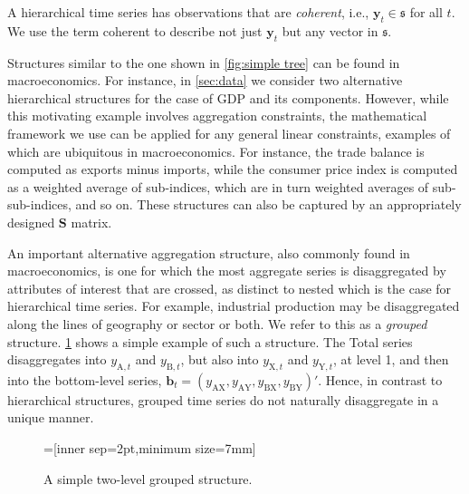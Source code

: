 {\begin{property}
	A hierarchical time series has observations that are \textit{coherent}, i.e., $\bm{y}_{t} \in \mathfrak{s}$ for all $t$. We use the term coherent to describe not just $\bm{y}_t$ but any vector in $\mathfrak{s}$.
	\label{prop:coherence}
\end{property}

Structures similar to the one shown in \ref{fig:simple tree} can be found in macroeconomics. For instance, in \ref{sec:data} we consider two alternative hierarchical structures for the case of GDP and its components. However, while this motivating example involves aggregation constraints, the mathematical framework we use can be applied for any general linear constraints, examples of which are ubiquitous in macroeconomics. For instance, the trade balance is computed as exports minus imports, while the consumer price index is computed as a weighted average of sub-indices, which are in turn weighted averages of sub-sub-indices, and so on. These structures can also be captured by an appropriately designed $\bm{S}$ matrix.

An important alternative aggregation structure, also commonly found in macroeconomics, is one for which the most aggregate series is disaggregated by attributes of interest that are crossed, as distinct to nested which is the case for hierarchical time series. For example, industrial production may be disaggregated along the lines of geography or sector or both. We refer to this as a \textit{grouped} structure. \ref{fig:simple grouped tree} shows a simple example of such a structure. The Total series disaggregates into $y_{\text{A},t}$ and $y_{\text{B},t}$, but also into $y_{\text{X},t}$ and $y_{\text{Y},t}$, at level 1, and then into the bottom-level series, $\bm{b}_t=(y_{\text{AX}}, y_{\text{AY}}, y_{\text{BX}}, y_{\text{BY}})'$. Hence, in contrast to hierarchical structures, grouped time series do not naturally disaggregate in a unique manner.

\begin{figure}[!hbt]\sidecaption\centering
	=[inner sep=2pt,minimum size=7mm]
	\caption{A simple two-level grouped structure.}
	\label{fig:simple grouped tree}
\end{figure}

}
